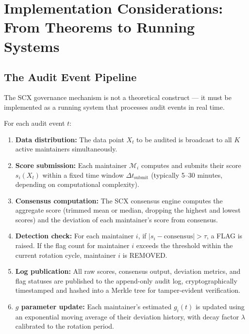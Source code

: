 \documentclass[12pt,a4paper]{article}
\theoremstyle{remark}
\begin{document}
\newpage

\section{}
\section{Implementation Considerations: From Theorems to Running Systems}

\subsection{The Audit Event Pipeline}

The SCX governance mechanism is not a theoretical construct — it must be
implemented as a running system that processes audit events in real time.

\begin{protocol}\label{prot:pipeline}
For each audit event $t$:
\begin{enumerate}[label=\textbf{Step \arabic*:}, leftmargin=*]
    \item \textbf{Data distribution:} The data point $X_t$ to be audited is
          broadcast to all $K$ active maintainers simultaneously.
    \item \textbf{Score submission:} Each maintainer $\mathcal{M}_i$ computes
          and submits their score $s_i(X_t)$ within a fixed time window
          $\Delta t_{\text{submit}}$ (typically 5--30 minutes, depending on
          computational complexity).
    \item \textbf{Consensus computation:} The SCX consensus engine computes the
          aggregate score (trimmed mean or median, dropping the highest and
          lowest scores) and the deviation of each maintainer's score from
          consensus.
    \item \textbf{Detection check:} For each maintainer $i$, if
          $|s_i - \text{consensus}| > \tau$, a FLAG is raised. If the flag count
          for maintainer $i$ exceeds the threshold within the current rotation
          cycle, maintainer $i$ is REMOVED.
    \item \textbf{Log publication:} All raw scores, consensus output, deviation
          metrics, and flag statuses are published to the append-only audit log,
          cryptographically timestamped and hashed into a Merkle tree for
          tamper-evident verification.
    \item \textbf{$g$ parameter update:} Each maintainer's estimated $g_i(t)$
          is updated using an exponential moving average of their deviation
          history, with decay factor $\lambda$ calibrated to the rotation period.
\end{enumerate}
\end{protocol}
\end{document}
